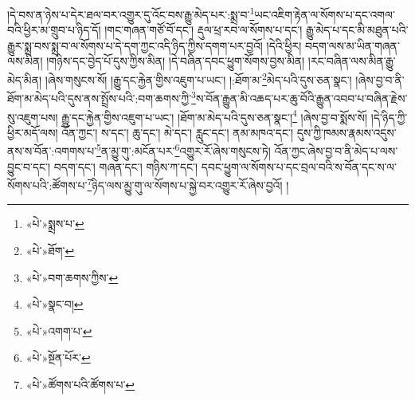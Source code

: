 །དེ་བས་ན་ཉེས་པ་དེར་ཐལ་བར་འགྱུར་དུ་འོང་བས་རྒྱུ་མེད་པར་:སྨྲ་བ་\footnote{«པེ་»སྨྲས་པ་}ཡང་འཇིག་རྟེན་ལ་སོགས་པ་དང་འགལ་བའི་ཕྱིར་མ་གྲུབ་པ་ཉིད་དོ། །གང་གཞན་གཙོ་བོ་དང་། རྡུལ་ཕྲ་རབ་ལ་སོགས་པ་དང་། རྒྱུ་མེད་པ་དང་མི་མཐུན་པའི་རྒྱུར་སྨྲ་བས་སྨྲ་བ་ལ་སོགས་པ་དེ་དག་ཀྱང་འདི་ཉིད་ཀྱིས་དགག་པར་བྱའོ། །དེའི་ཕྱིར། བདག་ལས་མ་ཡིན་གཞན་ལས་མིན། །གཉིས་དང་བྱེད་པོ་དུས་ཀྱིས་མིན། །དེ་བཞིན་དབང་ཕྱུག་སོགས་བྱས་མིན། །རང་བཞིན་ལས་མིན་རྒྱུ་མེད་མིན། །ཞེས་གསུངས་སོ། །རྒྱུ་དང་རྐྱེན་གྱིས་འཇུག་པ་ཡང་། །:ཐོག་མ་\footnote{«པེ་»ཐོག་}མེད་པའི་དུས་ཅན་སྣང་། །ཞེས་བྱ་བ་ནི་ཐོག་མ་མེད་པའི་དུས་ནས་སྤྲོས་པའི་:བག་ཆགས་ཀྱི་\footnote{«པེ་»བག་ཆགས་ཀྱིས་}ས་བོན་རྒྱུན་མི་འཆད་པར་ཆུ་བོའི་རྒྱུན་འབབ་པ་བཞིན་རྗེས་སུ་འཇུག་པས། རྒྱུ་དང་རྐྱེན་གྱིས་འཇུག་པ་ཡང་། །ཐོག་མ་མེད་པའི་དུས་ཅན་སྣང་།\footnote{«པེ་»སྣང་བ།} །ཞེས་བྱ་བ་སྨོས་སོ། །དེ་ཉིད་ཀྱི་ཕྱིར་མདོ་ལས། འོན་ཀྱང་། ས་དང་། ཆུ་དང་། མེ་དང་། རླུང་དང་། ནམ་མཁའ་དང་། དུས་ཀྱི་ཁམས་རྣམས་འདུས་ནས་ས་བོན་:འགགས་པ་\footnote{«པེ་»འགག་པ་}ན་མྱུ་གུ་:མངོན་པར་\footnote{«པེ་»སྔོན་པོར་}འགྱུར་རོ་ཞེས་གསུངས་ཏེ། འོན་ཀྱང་ཞེས་བྱ་བ་ནི་མེད་པ་ལས་བྱུང་བ་དང་། བདག་དང་། གཞན་དང་། གཉིས་ཀ་དང་། དབང་ཕྱུག་ལ་སོགས་པ་དང་བྲལ་བའི་ས་བོན་དང་ས་ལ་སོགས་པའི་:ཚོགས་པ་\footnote{«པེ་»ཚོགས་པའི་ཚོགས་པ་}ཉིད་ལས་མྱུ་གུ་ལ་སོགས་པ་སྐྱེ་བར་འགྱུར་རོ་ཞེས་བྱའོ། །

